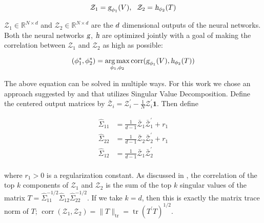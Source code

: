 \begin{equation}
  \label{eqn:cca}
 \mathcal{Z}_{1}=\textsl{g}_{\phi_1} (V),
 \hspace{6pt}
  \mathcal{Z}_{2}=\textsl{h}_{\phi_2} (T)
\end{equation}


$\mathcal{Z}_{1} \in \mathbb{R}^{N \times d}$ and $\mathcal{Z}_{2} \in \mathbb{R}^{N \times d}$ are the $\mathnormal{d}$ dimensional outputs of the neural networks. Both the neural networks $\textsl{g}$, $\textsl{h}$ are optimized jointly with a goal of making the correlation between $\mathcal{Z}_{1}$ and $\mathcal{Z}_{2}$ as high as possible:

$$
(\phi_{1}^{*}, \phi_{2}^{*})
=
\underset{\phi_{1}, \phi_{2}}{\arg \max } \operatorname{corr}(\textsl{g}_{\phi_1}(V), \textsl{h}_{\phi_2}(T))
$$

The above equation can be solved in multiple ways. For this work we chose an approach suggested by \citep{martin1979multivariate}  and that utilizes Singular Value Decomposition.
Define the centered output matrices by $\bar{\mathcal{Z}}_{i}=\mathcal{Z}_{i}^{\prime}-\frac{1}{N} \mathcal{Z}_{i}^{\prime} \mathbf{1}$. Then define

\begin{align}
    \hat{\Sigma}_{11} 
    &= 
    \frac{1}{d-1} \bar{\mathcal{Z}}_{1} \bar{\mathcal{Z}}_{1}^{\prime}+r_{1} \\ \nonumber
    \hat{\Sigma}_{22} 
    &= 
    \frac{1}{d-1} \bar{\mathcal{Z}}_{2} \bar{\mathcal{Z}}_{2}^{\prime}+r_{1} \\ \nonumber
    \hat{\Sigma}_{12}
    &=
    \frac{1}{d-1} \bar{\mathcal{Z}}_{1} \bar{\mathcal{Z}}_{2}^{\prime} \\ \nonumber
\end{align}

\noindent where $r_1 > 0$ is a regularization constant. As discussed in \cite{andrew2013deep}, the correlation of the top $k$ components of $\mathcal{Z}_{1}$ and $\mathcal{Z}_{2}$ is the sum of the top $k$ singular values of the matrix $T=\hat{\Sigma}_{11}^{-1 / 2} \hat{\Sigma}_{12} \hat{\Sigma}_{22}^{-1 / 2}$. If we take $k=d$, then this is exactly the matrix trace norm of $T$; $
\operatorname{corr}(\mathcal{Z}_{1}, \mathcal{Z}_{2})=\|T\|_{\operatorname{tr}}=\operatorname{tr}(T^{\prime} T)^{1 / 2}
$.



